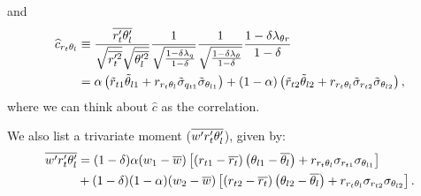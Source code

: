 and
\begin{align}
    \widehat{c}_{r_t \theta_l}
    &\equiv \frac{\overline{r_t' \theta_l'}}{\sqrt{\overline{r_t'^2}}\sqrt{\overline{\theta_l'^2}}}
    \frac{1}{\sqrt{\frac{1-\delta \lambda_q}{1-\delta}}}
    \frac{1}{\sqrt{\frac{1-\delta \lambda_\theta}{1-\delta}}}
    \frac{1 - \delta \lambda_{\theta r} }{1 - \delta} \nonumber\\
    &= \alpha \left(\tilde{r}_{t1} \tilde{\theta}_{l1} +
    r_{r_t \theta_l} \tilde{\sigma}_{q_{t1}} \tilde{\sigma}_{\theta_{l1}} \right) +
    (1 - \alpha) \left(\tilde{r}_{t2} \tilde{\theta}_{l2} +
    r_{r_t \theta_l} \tilde{\sigma}_{r_{t2}} \tilde{\sigma}_{\theta_{l2}} \right),
    \label{eq:c_hat_r_t_theta_l_nondim}
\end{align}
where we can think about $\widehat{c}$ as the correlation.

We also list a trivariate moment ($\overline{w' r_t' \theta_l'}$), given by:
\begin{align}
    \overline{w' r_t' \theta_l'}
    &= (1 - \delta) \alpha (w_1 - \overline{w}) \left[
        \left(r_{t1} - \overline{r_t}\right)
        \left(\theta_{l1} - \overline{\theta_l}\right) +
        r_{r_t \theta_l} \sigma_{r_{t1}} \sigma_{\theta_{l1}}
        \right] \nonumber\\
    &+ (1 - \delta) (1 - \alpha) (w_2 - \overline{w}) \left[
        \left(r_{t2} - \overline{r_t}\right)
        \left(\theta_{l2} - \overline{\theta_l}\right) +
        r_{r_t \theta_l} \sigma_{r_{t2}} \sigma_{\theta_{l2}}
        \right].
    \label{eq:w_prime_r_t_prime_t_l_prime_bar}
\end{align}
